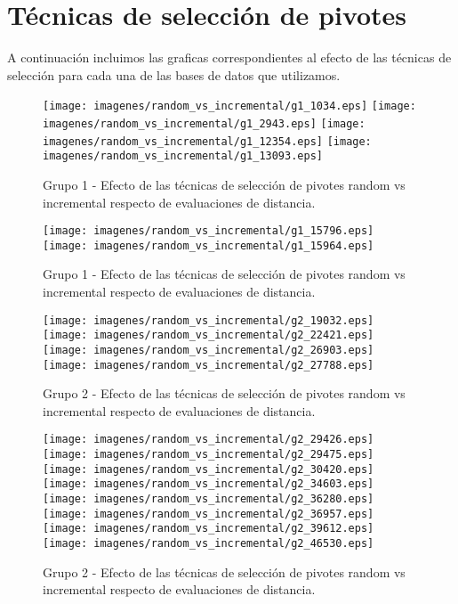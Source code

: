 \chapter{T\'ecnicas de selecci\'on de pivotes}\label{anexo.A}
A continuaci\'on incluimos las graficas correspondientes al efecto de las t\'ecnicas de selecci\'on para cada una de las bases de datos que utilizamos.\\

\begin{figure}[h!]
\centering
{\texttt{[image: imagenes/random\_vs\_incremental/g1\_1034.eps]}}
{\texttt{[image: imagenes/random\_vs\_incremental/g1\_2943.eps]}}
{\texttt{[image: imagenes/random\_vs\_incremental/g1\_12354.eps]}}
{\texttt{[image: imagenes/random\_vs\_incremental/g1\_13093.eps]}}
\caption{\small Grupo 1 - Efecto de las t\'ecnicas de selecci\'on de pivotes random vs incremental respecto de evaluaciones de distancia.}
\end{figure}

\begin{figure}[h!]
\centering
{\texttt{[image: imagenes/random\_vs\_incremental/g1\_15796.eps]}}
{\texttt{[image: imagenes/random\_vs\_incremental/g1\_15964.eps]}}
\caption{\small Grupo 1 - Efecto de las t\'ecnicas de selecci\'on de pivotes random vs incremental respecto de evaluaciones de distancia.}
\end{figure}

\begin{figure}[h!]
\centering
{\texttt{[image: imagenes/random\_vs\_incremental/g2\_19032.eps]}}
{\texttt{[image: imagenes/random\_vs\_incremental/g2\_22421.eps]}}
{\texttt{[image: imagenes/random\_vs\_incremental/g2\_26903.eps]}}
{\texttt{[image: imagenes/random\_vs\_incremental/g2\_27788.eps]}}
\caption{\small Grupo 2 - Efecto de las t\'ecnicas de selecci\'on de pivotes random vs incremental respecto de evaluaciones de distancia.}
\end{figure}
\begin{figure}[h!]
\centering
{\texttt{[image: imagenes/random\_vs\_incremental/g2\_29426.eps]}}
{\texttt{[image: imagenes/random\_vs\_incremental/g2\_29475.eps]}}
{\texttt{[image: imagenes/random\_vs\_incremental/g2\_30420.eps]}}
{\texttt{[image: imagenes/random\_vs\_incremental/g2\_34603.eps]}}
{\texttt{[image: imagenes/random\_vs\_incremental/g2\_36280.eps]}}
{\texttt{[image: imagenes/random\_vs\_incremental/g2\_36957.eps]}}
{\texttt{[image: imagenes/random\_vs\_incremental/g2\_39612.eps]}}
{\texttt{[image: imagenes/random\_vs\_incremental/g2\_46530.eps]}}
\caption{\small Grupo 2 - Efecto de las t\'ecnicas de selecci\'on de pivotes random vs incremental respecto de evaluaciones de distancia.}
\end{figure}


